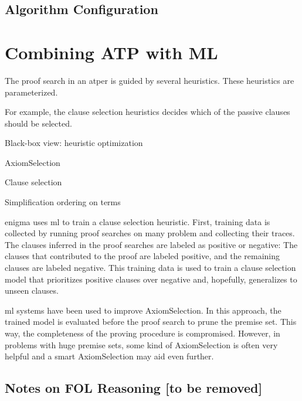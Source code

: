 \subsection{Algorithm Configuration}

\section{Combining ATP with ML}

The proof search in an \gls{atper} is guided by several heuristics.
These heuristics are parameterized.

For example, the clause selection heuristics decides which of the passive clauses should be selected.

Black-box view: heuristic optimization

\Gls{AxiomSelection}

Clause selection

Simplification ordering on terms


\Gls{enigma} uses \gls{ml} to train a clause selection heuristic.
First, training data is collected by running proof searches on many problem and collecting their traces.
The clauses inferred in the proof searches are labeled as positive or negative:
The clauses that contributed to the proof are labeled positive, and the remaining clauses are labeled negative.
This training data is used to train a clause selection model that prioritizes positive clauses over negative and, hopefully, generalizes to unseen clauses.

\Gls{ml} systems have been used to improve \gls{AxiomSelection}.
In this approach, the trained model is evaluated before the proof search to prune the premise set.
This way, the completeness of the proving procedure is compromised.
However, in problems with huge premise sets, some kind of \gls{AxiomSelection} is often very helpful and a smart \gls{AxiomSelection} may aid even further.



\subsection{Notes on FOL Reasoning [to be removed]}



